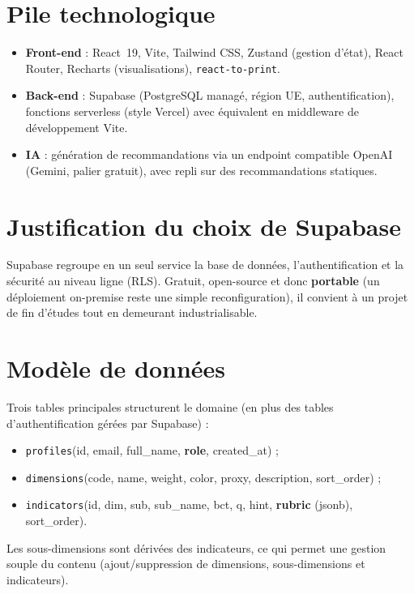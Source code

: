 \documentclass[11pt,a4paper]{report}
\begin{document}
\section{Pile technologique}
\begin{itemize}[noitemsep]
  \item \textbf{Front-end} : React~19, Vite, Tailwind CSS, Zustand (gestion
  d'état), React Router, Recharts (visualisations), \texttt{react-to-print}.
  \item \textbf{Back-end} : Supabase (PostgreSQL managé, région UE,
  authentification), fonctions serverless (style Vercel) avec équivalent en
  middleware de développement Vite.
  \item \textbf{IA} : génération de recommandations via un endpoint compatible
  OpenAI (Gemini, palier gratuit), avec repli sur des recommandations statiques.
\end{itemize}

\section{Justification du choix de Supabase}
Supabase regroupe en un seul service la base de données, l'authentification et la
sécurité au niveau ligne (RLS). Gratuit, open-source et donc \textbf{portable}
(un déploiement on-premise reste une simple reconfiguration), il convient à un
projet de fin d'études tout en demeurant industrialisable.

\section{Modèle de données}
Trois tables principales structurent le domaine (en plus des tables
d'authentification gérées par Supabase) :
\begin{itemize}[noitemsep]
  \item \texttt{profiles}(id, email, full\_name, \textbf{role}, created\_at) ;
  \item \texttt{dimensions}(code, name, weight, color, proxy, description,
  sort\_order) ;
  \item \texttt{indicators}(id, dim, sub, sub\_name, bct, q, hint,
  \textbf{rubric} (jsonb), sort\_order).
\end{itemize}
Les sous-dimensions sont dérivées des indicateurs, ce qui permet une gestion
souple du contenu (ajout/suppression de dimensions, sous-dimensions et
indicateurs).
\end{document}
